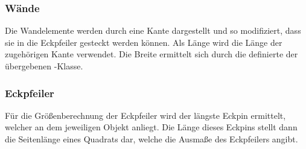 \subsubsection{Wände}
Die Wandelemente werden durch eine Kante dargestellt und so modifiziert, dass sie in die Eckpfeiler gesteckt werden können.
Als Länge wird die Länge der zugehörigen Kante verwendet.
Die Breite ermittelt sich durch die definierte  der übergebenen -Klasse.

\subsubsection{Eckpfeiler}
Für die Größenberechnung der Eckpfeiler wird der längste Eckpin ermittelt, welcher an dem jeweiligen Objekt anliegt.
Die Länge dieses Eckpins stellt dann die Seitenlänge eines Quadrats dar, welche die Ausmaße des Eckpfeilers angibt.

